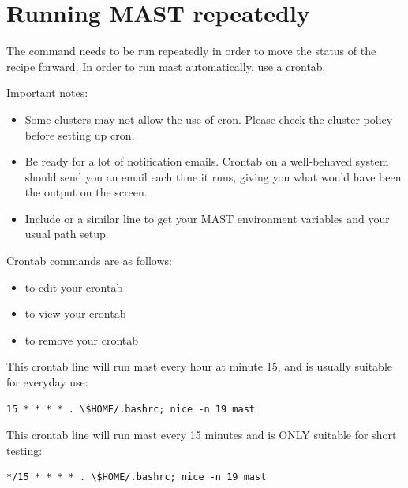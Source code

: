 \documentclass[letterpaper,10pt,english]{sphinxmanual}
\begin{document}
\section{Running MAST repeatedly}
\label{5_0_runningmast:running-mast-repeatedly}
The command  needs to be run repeatedly in order to move the status of the recipe forward. In order to run mast automatically, use a crontab.

Important notes:
\begin{itemize}
\item {} 
Some clusters may not allow the use of cron. Please check the cluster policy before setting up cron.

\item {} 
Be ready for a lot of notification emails. Crontab on a well-behaved system should send you an email each time it runs, giving you what would have been the output on the screen.

\item {} 
Include  or a similar line to get your MAST environment variables and your usual path setup.

\end{itemize}

Crontab commands are as follows:
\begin{itemize}
\item {} 
 to edit your crontab

\item {} 
 to view your crontab

\item {} 
 to remove your crontab

\end{itemize}

This crontab line will run mast every hour at minute 15, and is usually suitable for everyday use:

\begin{Verbatim}[commandchars=\\\{\}]
15 * * * * . \$HOME/.bashrc; nice -n 19 mast
\end{Verbatim}

This crontab line will run mast every 15 minutes and is ONLY suitable for short testing:

\begin{Verbatim}[commandchars=\\\{\}]
*/15 * * * * . \$HOME/.bashrc; nice -n 19 mast
\end{Verbatim}
\end{document}

